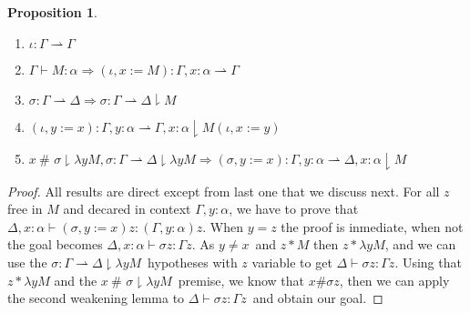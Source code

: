 \documentclass{article}
\newcommand{\freer}[2]{\ensuremath{#1 *#2}}
\newcommand{\res}[2]{\ensuremath{#1\downharpoonright#2}}
\newcommand{\fresh}[3]{\ensuremath{#1\ \#\,\,\res{#2}{#3}}}
\newcommand{\upd}[3]{\ensuremath{#1, #2 {:=} #3}}
\newtheorem{prop}{Proposition}
\newcommand{\type}[3]{\ensuremath{#1 \vdash #2 : #3}}
\newcommand{\goes}[3]{\ensuremath{#1 : #2 \rightharpoonup #3}}
\newcommand{\goesd}[4]{\ensuremath{#1 : #2 \rightharpoonup #3 \downharpoonright #4}}
\begin{document}
\begin{prop}
  \begin{enumerate}
  \item $\goes{\iota}{\Gamma}{\Gamma}$
  \item $\type{\Gamma}{M}{\alpha} \Rightarrow \goes{(\upd{\iota}{x}{M})}{\Gamma , x : \alpha}{\Gamma} $
  \item $\goes{\sigma}{\Gamma}{\Delta} \Rightarrow \goesd{\sigma}{\Gamma}{\Delta}{M}$
  \item $\goesd{(\upd{\iota}{y}{x})}{\Gamma,y:\alpha}{\Gamma,x:\alpha}{M (\upd{\iota}{x}{y})}$
  \item $\fresh{x}{\sigma}{\lambda y M},  \goesd{\sigma}{\Gamma}{\Delta}{\lambda y M} \Rightarrow \goesd{(\upd{\sigma}{y}{x})}{\Gamma, y : \alpha}{\Delta,x:\alpha}{M}$
  \end{enumerate}
\end{prop}

\begin{proof}
  All results are direct except from last one that we discuss next. For all $z$ free in $M$ and decared in context $\Gamma,y:\alpha$, we have to prove that $\type{\Delta,x:\alpha}{(\upd{\sigma}{y}{x})z}{(\Gamma,y:\alpha)z}$. When $y = z$ the proof is inmediate, when not the goal becomes $\type{\Delta,x:\alpha}{\sigma z}{\Gamma z}$. As $y \neq x$\ and $z * M$ then $z * \lambda y M$, and we can use the $\goesd{\sigma}{\Gamma}{\Delta}{\lambda y M}$\ hypotheses with $z$ variable to get $\type{\Delta}{\sigma z}{\Gamma z}$. Using that $z * \lambda y M$ and the $\fresh{x}{\sigma}{\lambda y M}$\ premise, we know that $x \# \sigma z$, then we can apply the second weakening lemma to $\type{\Delta}{\sigma z}{\Gamma z}$\ and obtain our goal.
\end{proof}


\end{document}
